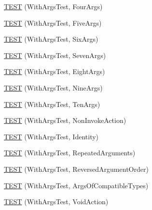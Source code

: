 \begin{DoxyCompactItemize}
\item 
\mbox{\hyperlink{namespacetesting_1_1gmock__generated__actions__test_ab7046e566f75756b6fe1ec4d92ff7c2b}{T\+E\+ST}} (With\+Args\+Test, Four\+Args)
\item 
\mbox{\hyperlink{namespacetesting_1_1gmock__generated__actions__test_ab51a43ea1c760e001330400d6cec5bfc}{T\+E\+ST}} (With\+Args\+Test, Five\+Args)
\item 
\mbox{\hyperlink{namespacetesting_1_1gmock__generated__actions__test_a167731ec11d5cf4135d95b01dc59e223}{T\+E\+ST}} (With\+Args\+Test, Six\+Args)
\item 
\mbox{\hyperlink{namespacetesting_1_1gmock__generated__actions__test_a04970f4db4de11d91e59ae8769dccea1}{T\+E\+ST}} (With\+Args\+Test, Seven\+Args)
\item 
\mbox{\hyperlink{namespacetesting_1_1gmock__generated__actions__test_a5cbb36915cb29391752600a2a0e9c7e1}{T\+E\+ST}} (With\+Args\+Test, Eight\+Args)
\item 
\mbox{\hyperlink{namespacetesting_1_1gmock__generated__actions__test_aee9acec4535339649dd3067f671cc6c1}{T\+E\+ST}} (With\+Args\+Test, Nine\+Args)
\item 
\mbox{\hyperlink{namespacetesting_1_1gmock__generated__actions__test_a6a818f5a6c2250d3944f90e4331ebc0e}{T\+E\+ST}} (With\+Args\+Test, Ten\+Args)
\item 
\mbox{\hyperlink{namespacetesting_1_1gmock__generated__actions__test_a5380c41df40cb159d58d4c4c81aeac19}{T\+E\+ST}} (With\+Args\+Test, Non\+Invoke\+Action)
\item 
\mbox{\hyperlink{namespacetesting_1_1gmock__generated__actions__test_a0499d0970300d8d6c252a898222b8dd3}{T\+E\+ST}} (With\+Args\+Test, Identity)
\item 
\mbox{\hyperlink{namespacetesting_1_1gmock__generated__actions__test_aea7114a30b1fc589d14e84f1a27bd1fb}{T\+E\+ST}} (With\+Args\+Test, Repeated\+Arguments)
\item 
\mbox{\hyperlink{namespacetesting_1_1gmock__generated__actions__test_a8a9dc47b8e9810ca74166a9d17cba54f}{T\+E\+ST}} (With\+Args\+Test, Reversed\+Argument\+Order)
\item 
\mbox{\hyperlink{namespacetesting_1_1gmock__generated__actions__test_a4330224375c915f21860c30798dacd0c}{T\+E\+ST}} (With\+Args\+Test, Args\+Of\+Compatible\+Types)
\item 
\mbox{\hyperlink{namespacetesting_1_1gmock__generated__actions__test_a744fd048a745e3df48a578ed251003c6}{T\+E\+ST}} (With\+Args\+Test, Void\+Action)
\end{DoxyCompactItemize}

